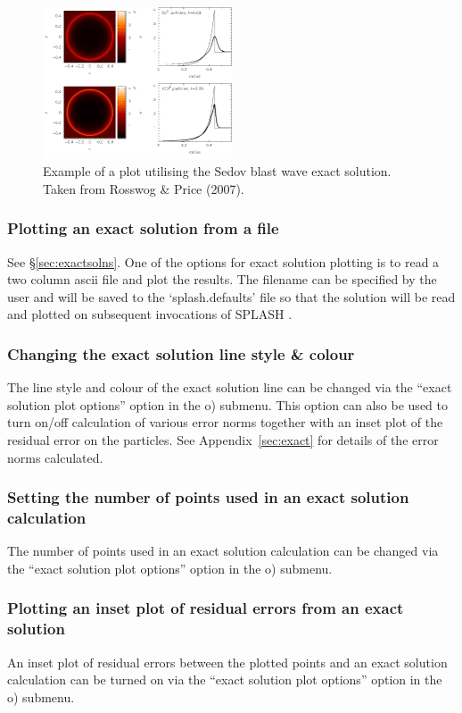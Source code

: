 \documentclass[a4paper,10pt]{article}
\newcommand{\splash}{\textsc{SPLASH }}
\begin{document}
\begin{figure}[h]
\begin{center}
\includegraphics[width=0.5\textwidth]{sedov_example.png}
\caption{Example of a plot utilising the Sedov blast wave exact solution. Taken from Rosswog \& Price (2007).}
\label{fig:sedov}
\end{center}
\end{figure}


\subsubsection{ Plotting an exact solution from a file}
 See \S\ref{sec:exactsolns}. One of the options for exact solution plotting is to read a two column ascii file and plot the results. The filename can be specified by the user and will be saved to the `splash.defaults' file so that the solution will be read and plotted on subsequent invocations of \splash.

\subsubsection{ Changing the exact solution line style \& colour}
 The line style and colour of the exact solution line can be changed via the ``exact solution plot options'' option in the o) submenu. This option can also be used to turn on/off calculation of various error norms
together with an inset plot of the residual error on the particles. See
Appendix~\ref{sec:exact} for details of the error norms calculated.

\subsubsection{ Setting the number of points used in an exact solution calculation}
The number of points used in an exact solution calculation can be changed via the ``exact solution plot options'' option in the o) submenu.

\subsubsection{ Plotting an inset plot of residual errors from an exact solution}
 An inset plot of residual errors between the plotted points and an exact solution calculation can be turned on via the ``exact solution plot options'' option in the o) submenu.
\end{document}
